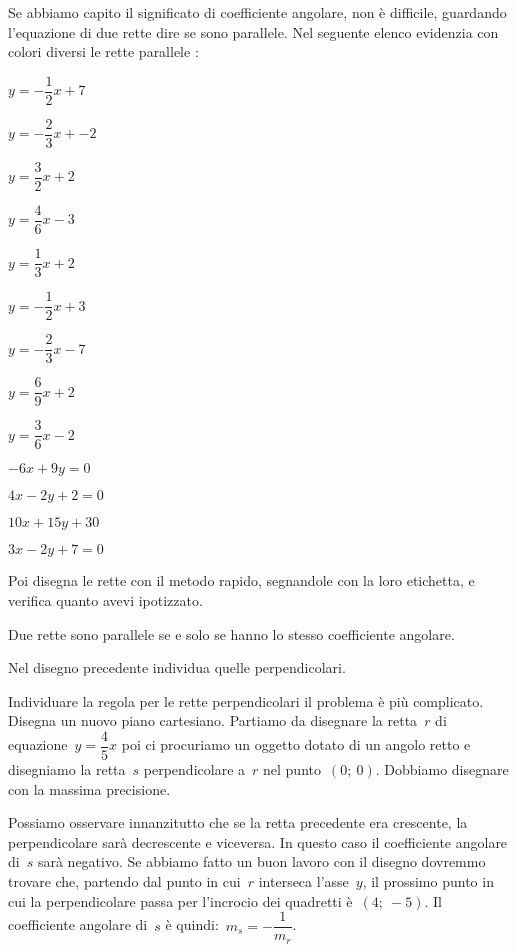Se abbiamo capito il significato di coefficiente angolare, non è difficile, 
guardando l'equazione di due rette dire se sono parallele. Nel seguente 
elenco evidenzia con colori diversi le rette parallele :

\begin{multicols}{4}
 \TabPositions{0.6cm}
 \begin{enumeratea}
 \item \(y=-\dfrac{1}{2}x + 7\)
 \item \(y=-\dfrac{2}{3}x + -2\)
 \item \(y=\dfrac{3}{2}x + 2\)
 \item \(y=\dfrac{4}{6}x - 3\)
 \item \(y=\dfrac{1}{3}x + 2\)
 \item \(y=-\dfrac{1}{2}x + 3\)
 \item \(y=-\dfrac{2}{3}x - 7\)
 \item \(y=\dfrac{6}{9}x + 2\)
 \item \(y=\dfrac{3}{6}x - 2\)
 \item \(-6x + 9y = 0\) \\[-.8em]
 \item \(4x - 2y + 2 = 0\) \\[-.8em]
 \item \(10x + 15y + 30\) \\[-.8em]
 \item \(3x -2y + 7 = 0\)
 \end{enumeratea}
\end{multicols}

Poi disegna le rette con il metodo rapido, segnandole con la loro etichetta, 
e verifica quanto avevi ipotizzato. 

\begin{definizione}
Due rette sono parallele se e solo se hanno lo stesso coefficiente angolare.
\end{definizione}

Nel disegno precedente individua quelle perpendicolari.

Individuare la regola per le rette perpendicolari il problema è più 
complicato. 
Disegna un nuovo piano cartesiano.
Partiamo da disegnare la retta~\(r\) di equazione~\(y = \dfrac{4}{5} x\) poi 
ci procuriamo un oggetto dotato di un angolo retto e disegniamo la 
retta~\(s\) perpendicolare a~\(r\) nel punto~\((0;~0)\). 
Dobbiamo disegnare con la massima precisione. 

Possiamo osservare innanzitutto che se la retta precedente era crescente, la 
perpendicolare sarà decrescente e viceversa. In questo caso il coefficiente 
angolare di~\(s\) sarà negativo. 
Se abbiamo fatto un buon lavoro con il disegno dovremmo trovare che, partendo 
dal punto in cui~\(r\) interseca l'asse~\(y\), il 
prossimo punto in cui la perpendicolare passa per l'incrocio dei quadretti 
è~\((4;~-5)\). Il coefficiente angolare di~\(s\) è 
quindi:~\(m_s = - \dfrac{1}{m_r}\).

